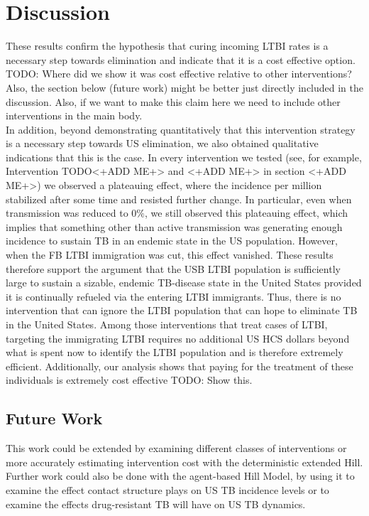 \documentclass{amsart}
\begin{document}
\section{Discussion}
These results confirm the hypothesis that curing incoming LTBI rates is a
necessary step towards elimination and indicate that it is a cost effective
option. \\
{\huge \color{red} TODO: Where did we show it was cost effective relative to other
interventions? Also, the section below (future work) might be better just
directly included in the discussion. Also, if we want to make this claim here we
need to include other interventions in the main body.}\\
In addition, beyond demonstrating quantitatively that this intervention strategy
is a necessary step towards US elimination, we also obtained qualitative
indications that this is the case. In every intervention we tested (see, for
example, Intervention {\huge\color{red} TODO}<+ADD ME+> and <+ADD ME+> in section <+ADD ME+>) we
observed a plateauing effect, where the incidence per million stabilized after
some time and resisted further change. In particular, even when transmission was
reduced to $0\%$, we still observed this plateauing effect, which implies that
something other than active transmission was generating enough incidence to
sustain TB in an endemic state in the US population. However, when the FB LTBI
immigration was cut, this effect vanished. These results therefore support the
argument that the USB LTBI population is sufficiently large to sustain a
sizable, endemic TB-disease state in the United States provided it is
continually refueled via the entering LTBI immigrants. Thus, there is no
intervention that can ignore the LTBI population that can hope to eliminate TB
in the United States. Among those interventions that treat cases of LTBI,
targeting the immigrating LTBI requires no additional US HCS dollars beyond what
is spent now to identify the LTBI population and is therefore extremely
efficient. Additionally, our analysis shows that paying for the treatment of
these individuals is extremely cost effective {\huge \color{red} TODO: Show
this}.
\subsection{Future Work}
This work could be extended by examining different classes of interventions or
more accurately estimating intervention cost with the deterministic extended
Hill. Further work could also be done with the agent-based Hill Model, by using
it to examine the effect contact structure plays on US TB incidence levels or to
examine the effects drug-resistant TB will have on US TB dynamics. 
\end{document}
